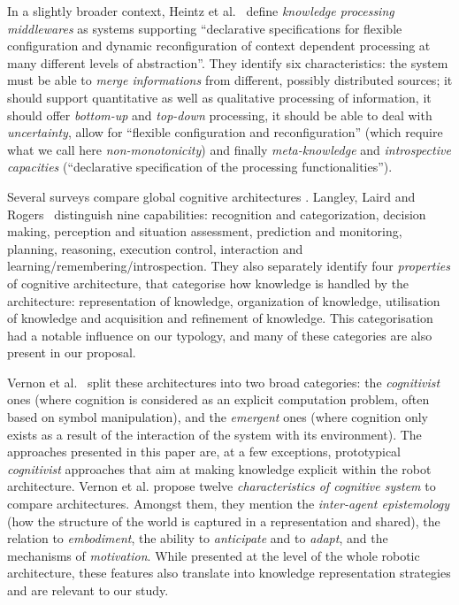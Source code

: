 In a slightly broader context, Heintz et al.~\cite{Heintz2008} define
\emph{knowledge processing middlewares} as systems supporting ``declarative
specifications for flexible configuration and dynamic reconfiguration of
context dependent processing at many different levels of abstraction''. They
identify six characteristics: the system must be able to \emph{merge
informations} from different, possibly distributed sources; it should support
quantitative as well as qualitative processing of information, it should offer
\emph{bottom-up} and \emph{top-down} processing, it should be able to deal with
\emph{uncertainty}, allow for ``flexible configuration and reconfiguration''
(which require what we call here \emph{non-monotonicity}) and finally
\emph{meta-knowledge} and \emph{introspective capacities} (``declarative
specification of the processing functionalities'').

Several surveys compare global cognitive architectures \cite{Langley2006,
Vernon2007, Chong2009}. Langley, Laird and Rogers~\cite{Langley2006}
distinguish nine capabilities: recognition and categorization, decision making,
perception and situation assessment, prediction and monitoring, planning,
reasoning, execution control, interaction and
learning/remembering/introspection. They also separately identify four
\emph{properties} of cognitive architecture, that categorise how knowledge is
handled by the architecture: representation of knowledge, organization of
knowledge, utilisation of knowledge and acquisition and refinement of
knowledge. This categorisation had a notable influence on our typology, and
many of these categories are also present in our proposal.

Vernon et al.~\cite{Vernon2007} split these architectures into two broad
categories: the \emph{cognitivist} ones (where cognition is considered as an
explicit computation problem, often based on symbol manipulation), and the
\emph{emergent} ones (where cognition only exists as a result of the
interaction of the system with its environment). The approaches presented in
this paper are, at a few exceptions, prototypical \emph{cognitivist} approaches
that aim at making knowledge explicit within the robot architecture. Vernon et
al. propose twelve \emph{characteristics of cognitive system} to compare
architectures. Amongst them, they mention the \emph{inter-agent epistemology}
(how the structure of the world is captured in a representation and shared),
the relation to \emph{embodiment}, the ability to \emph{anticipate} and to
\emph{adapt}, and the mechanisms of \emph{motivation}. While presented at the
level of the whole robotic architecture, these features also translate into
knowledge representation strategies and are relevant to our study.

